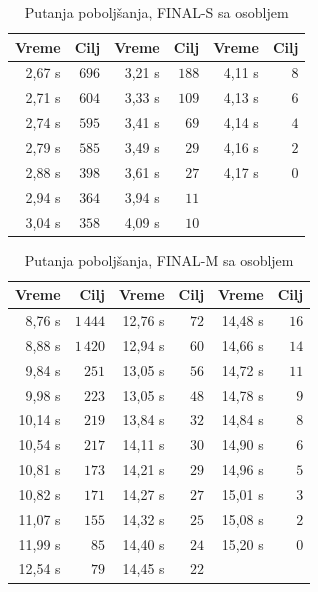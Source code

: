 \documentclass[12pt,oneside]{memoir}
\begin{document}
\begin{table}[ht]
\centering
\caption{Putanja poboljšanja, FINAL-S sa osobljem}
\label{tbl:final_traj_s}
\begin{tabular}{rr@{\hskip 2em}rr@{\hskip 2em}rr}
\toprule
\textbf{Vreme} & \textbf{Cilj} & \textbf{Vreme} & \textbf{Cilj}
& \textbf{Vreme} & \textbf{Cilj} \\
\midrule
2,67 s & $696$ & 3,21 s & $188$ & 4,11 s & $8$ \\
2,71 s & $604$ & 3,33 s & $109$ & 4,13 s & $6$ \\
2,74 s & $595$ & 3,41 s & $69$  & 4,14 s & $4$ \\
2,79 s & $585$ & 3,49 s & $29$  & 4,16 s & $2$ \\
2,88 s & $398$ & 3,61 s & $27$  & 4,17 s & $0$ \\
2,94 s & $364$ & 3,94 s & $11$  &        &     \\
3,04 s & $358$ & 4,09 s & $10$  &        &     \\
\bottomrule
\end{tabular}
\end{table}

\begin{table}[ht]
\centering
\caption{Putanja poboljšanja, FINAL-M sa osobljem}
\label{tbl:final_traj_m}
\begin{tabular}{rr@{\hskip 2em}rr@{\hskip 2em}rr}
\toprule
\textbf{Vreme} & \textbf{Cilj} & \textbf{Vreme} & \textbf{Cilj}
& \textbf{Vreme} & \textbf{Cilj} \\
\midrule
8,76 s  & $1\,444$ & 12,76 s & $72$ & 14,48 s & $16$ \\
8,88 s  & $1\,420$ & 12,94 s & $60$ & 14,66 s & $14$ \\
9,84 s  & $251$    & 13,05 s & $56$ & 14,72 s & $11$ \\
9,98 s  & $223$    & 13,05 s & $48$ & 14,78 s & $9$ \\
10,14 s & $219$    & 13,84 s & $32$ & 14,84 s & $8$ \\
10,54 s & $217$    & 14,11 s & $30$ & 14,90 s & $6$ \\
10,81 s & $173$    & 14,21 s & $29$ & 14,96 s & $5$ \\
10,82 s & $171$    & 14,27 s & $27$ & 15,01 s & $3$ \\
11,07 s & $155$    & 14,32 s & $25$ & 15,08 s & $2$ \\
11,99 s & $85$     & 14,40 s & $24$ & 15,20 s & $0$ \\
12,54 s & $79$     & 14,45 s & $22$ &         &     \\
\bottomrule
\end{tabular}
\end{table}
\end{document}
